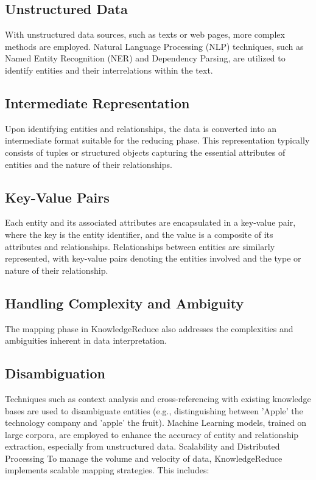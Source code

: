 \documentclass{article}
\begin{document}
\subsection{Unstructured Data}
With unstructured data sources, such as texts or web pages, more complex methods are employed. Natural Language Processing (NLP) techniques, such as Named Entity Recognition (NER) and Dependency Parsing, are utilized to identify entities and their interrelations within the text.
\subsection{Intermediate Representation}
Upon identifying entities and relationships, the data is converted into an intermediate format suitable for the reducing phase. This representation typically consists of tuples or structured objects capturing the essential attributes of entities and the nature of their relationships.

\subsection{Key-Value Pairs}
Each entity and its associated attributes are encapsulated in a key-value pair, where the key is the entity identifier, and the value is a composite of its attributes and relationships.
Relationships between entities are similarly represented, with key-value pairs denoting the entities involved and the type or nature of their relationship.
\subsection{Handling Complexity and Ambiguity}
The mapping phase in KnowledgeReduce also addresses the complexities and ambiguities inherent in data interpretation.

\subsection{Disambiguation}
Techniques such as context analysis and cross-referencing with existing knowledge bases are used to disambiguate entities (e.g., distinguishing between 'Apple' the technology company and 'apple' the fruit).
Machine Learning models, trained on large corpora, are employed to enhance the accuracy of entity and relationship extraction, especially from unstructured data.
Scalability and Distributed Processing
To manage the volume and velocity of data, KnowledgeReduce implements scalable mapping strategies. This includes:
\end{document}
